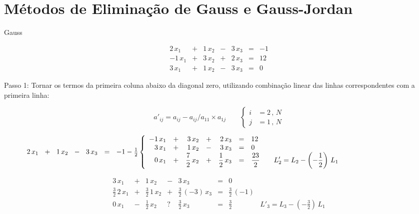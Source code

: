 \section{Métodos de Eliminação de Gauss e Gauss-Jordan}

\begin{enumerar}

\item Gauss

\[
\begin{array}{rrrrrrr}
 2\,x_1 & + & 1\,x_2 & - & 3\,x_3 & = & -1 \\
-1\,x_1 & + & 3\,x_2 & + & 2\,x_3 & = & 12 \\
 3\,x_1 & + & 1\,x_2 & - & 3\,x_3 & = & 0
\end{array}
\]

Passo 1: Tornar os termos da primeira coluna abaixo da diagonal zero, utilizando combinação linear das linhas correspondentes com a primeira linha:

\[
 a'_{ij} = a_{ij} - a_{ij}/a_{11} \times a_{1j}
 \qquad
 \left\{
  \begin{array}{ll}
   i & = 2\,,\, N \\
   j & = 1\,,\, N
  \end{array}
 \right.
\]

$
 \qquad \quad \, 2\,x_1 \,\,\,\, + \,\,\,\, 1\,x_2 \,\,\,\, - \,\,\,\, 3\,x_3 \,\,\,\, = \,\,\,\,  -1 \\
 -\frac{1}{2}
 \left\{
 \begin{array}{rrrrrrl}
 -1\,x_1 & + & 3\,x_2 & + & 2\,x_3 & = & 12 \\
  3\,x_1 & + & 1\,x_2 & - & 3\,x_3 & = & 0 \\
  0\,x_1 & + & \displaystyle \frac{7}{2}\,x_2 & + & \displaystyle \frac{1}{2}\,x_3 & = & \displaystyle \frac{23}{2} \qquad L'_2 = L_2 - \left(-\displaystyle\frac{1}{2}\right) \, L_1
 \end{array}
 \right.
$

\[
 \begin{array}{rrrrrrl}
  3\,x_1 & + & 1\,x_2 & - & 3\,x_3 & = & 0 \\
  \displaystyle \frac{3}{2}\,2\,x_1 & + & \displaystyle \frac{3}{2}\,1\,x_2 & + & \displaystyle \frac{3}{2}\,(-3)\,x_3 & = & \displaystyle \frac{3}{2}\,(-1) \\
  0\,x_1 & - & \displaystyle \frac{1}{2}\,x_2 & ? & \displaystyle \frac{3}{2}\,x_3 & = & \displaystyle \frac{3}{2} \qquad \qquad L'_3 = L_3 - \left(-\displaystyle\frac{3}{2}\right) \, L_1
 \end{array}
\]

\end{enumerar}